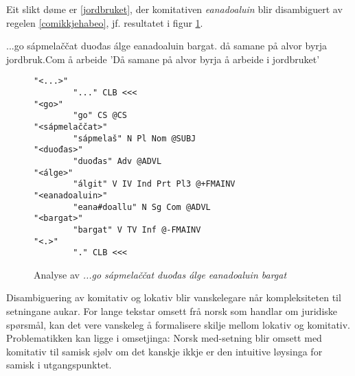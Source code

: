 \documentclass[a4paper,norsk]{article}
\begin{document}
Eit slikt døme er \ref{jordbruket}, der komitativen \emph{eanadoaluin} blir disambiguert av regelen \ref{comikkjehabeo}, jf. resultatet i figur \ref{comverbana}.%

\begin{example}\label{jordbruket}
\gll ...go sápmelaččat duođas álge eanadoaluin bargat.
     då samane {på alvor} byrja jordbruk.Com {å arbeide}
\glt 'Då samane på alvor byrja å arbeide i jordbruket'
\glend     
\end{example}

\begin{figure}[htbp]
\begin{center}
\begin{verbatim}
"<...>"
        "..." CLB <<<
"<go>"
        "go" CS @CS
"<sápmelaččat>"
        "sápmelaš" N Pl Nom @SUBJ
"<duođas>"
        "duođas" Adv @ADVL
"<álge>"
        "álgit" V IV Ind Prt Pl3 @+FMAINV
"<eanadoaluin>"
        "eana#doallu" N Sg Com @ADVL
"<bargat>"
        "bargat" V TV Inf @-FMAINV
"<.>"
        "." CLB <<<
\end{verbatim}
\caption{Analyse av \textit{...go sápmelaččat duođas álge eanadoaluin bargat}}
\label{comverbana}
\end{center}
\end{figure}



Disambiguering av komitativ og lokativ blir vanskelegare når kompleksiteten til setningane aukar. For lange tekstar omsett frå norsk som handlar om juridiske spørsmål, kan det vere vanskeleg å formalisere skilje mellom lokativ og komitativ. Problematikken kan ligge i omsetjinga: Norsk med-setning blir omsett med komitativ til samisk sjølv om det kanskje ikkje er den intuitive løysinga for samisk i utgangspunktet. %

\end{document}
